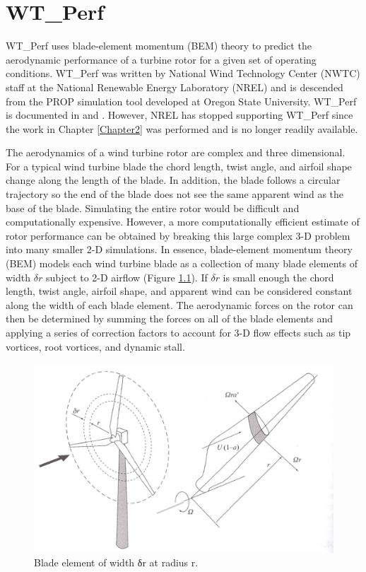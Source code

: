 
\chapter{WT\_Perf} %

\label{AppendixE} %


WT\_Perf uses blade-element momentum (BEM) theory to predict the aerodynamic performance of a turbine rotor for a given set of operating conditions. WT\_Perf was written by National Wind Technology Center (NWTC) staff at the National Renewable Energy Laboratory (NREL) and is descended from the PROP simulation tool developed at Oregon State University. WT\_Perf is documented in \cite{buhl2012} and \cite{buhl2012}. However, NREL has stopped supporting WT\_Perf since the work in Chapter \ref{Chapter2} was performed and \cite{buhl2012} is no longer readily available.

The aerodynamics of a wind turbine rotor are complex and three dimensional. For a typical wind turbine blade the chord length, twist angle, and airfoil shape change along the length of the blade. In addition, the blade follows a circular trajectory so the end of the blade does not see the same apparent wind as the base of the blade. Simulating the entire rotor would be difficult and computationally expensive. However, a more computationally efficient estimate of rotor performance can be obtained by breaking this large complex 3-D problem into many smaller 2-D simulations. In essence, blade-element momentum theory (BEM) models each wind turbine blade as a collection of many blade elements of width $\delta{r}$ subject to 2-D airflow (Figure \ref{figE-1}). If $\delta{r}$ is small enough the chord length, twist angle, airfoil shape, and apparent wind can be considered constant along the width of each blade element. The aerodynamic forces on the rotor can then be determined by summing the forces on all of the blade elements and applying a series of correction factors to account for 3-D flow effects such as tip vortices, root vortices, and dynamic stall. 



\begin{figure}[ht]
	\centering
		\includegraphics[width=.6\textwidth]{Figures/AppendixEFigures/figE-1.png}
	\caption{Blade element of width δr at radius r.\cite{burton2011} }
	\label{figE-1}
\end{figure}


